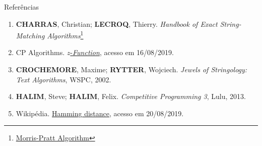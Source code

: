 \begin{frame}[fragile]{Referências}

    \begin{enumerate}
        \item \textbf{CHARRAS}, Christian; \textbf{LECROQ}, Thierry. \textit{Handbook of Exact String-Matching Algorithms}\footnote{\href{http://www-igm.univ-mlv.fr/~lecroq/string/node7.html}{Morris-Pratt Algorithm}}

        \item CP Algorithms. \href{https://cp-algorithms.com/string/z-function.html}{$z$-{\it Function}}, acesso em 16/08/2019.

        \item \textbf{CROCHEMORE}, Maxime; \textbf{RYTTER}, Wojciech. \textit{Jewels of Stringology: Text Algorithms}, WSPC, 2002.

        \item \textbf{HALIM}, Steve; \textbf{HALIM}, Felix. \textit{Competitive Programming 3}, Lulu, 2013.

        \item Wikipédia. \href{https://en.wikipedia.org/wiki/Hamming_distance}{Hamming distance},
            acesso em 20/08/2019.
    \end{enumerate}

\end{frame}
